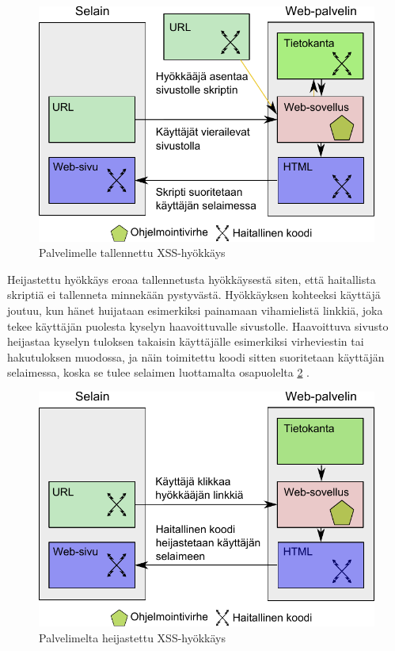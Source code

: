 \begin{figure}[htp]
\centering
\includegraphics[width=12cm]{pics/tallennettu.pdf}
\caption{Palvelimelle tallennettu XSS-hyökkäys}
\label{tallennettu}
\end{figure}

\newpage
Heijastettu hyökkäys eroaa tallennetusta hyökkäysestä siten, että haitallista skriptiä ei tallenneta minnekään pystyvästä. Hyökkäyksen kohteeksi käyttäjä joutuu, kun 
hänet huijataan esimerkiksi painamaan vihamielistä linkkiä, joka tekee käyttäjän puolesta kyselyn haavoittuvalle sivustolle. Haavoittuva sivusto heijastaa kyselyn tuloksen 
takaisin käyttäjälle esimerkiksi virheviestin tai hakutuloksen muodossa, ja näin toimitettu koodi sitten suoritetaan käyttäjän selaimessa, koska se tulee selaimen luottamalta
osapuolelta \ref{heijastettu} \cite{WEB2}.

\begin{figure}[htp]
\centering
\includegraphics[width=12cm]{pics/heijastettu.pdf}
\caption{Palvelimelta heijastettu XSS-hyökkäys}
\label{heijastettu}
\end{figure}

